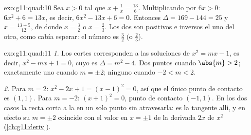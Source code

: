 \begin{solution}{exo:g11:quad:10}
Sea $x > 0$ tal que $x + \frac1x = \frac{13}{6}$. Multiplicando por
$6x > 0$: $6x^2 + 6 = 13x$, es decir, $6x^2 - 13x + 6 = 0$. Entonces
$\Delta = 169 - 144 = 25$ y $x = \frac{13 \pm 5}{12}$, de donde
$x = \frac32$ o $x = \frac23$. Los dos son positivos e inversos el uno del
otro, como cabía esperar: el número es $\frac32$ (o $\frac23$).
\end{solution}

\begin{solution}{exo:g11:quad:11}
\emph{1.} Los cortes corresponden a las soluciones de $x^2 = mx - 1$, es
decir, $x^2 - mx + 1 = 0$, cuyo  es $\Delta = m^2 - 4$. Dos
puntos cuando $\abs{m} > 2$; exactamente uno cuando $m = \pm 2$; ninguno
cuando $-2 < m < 2$.

\emph{2.} Para $m = 2$: $x^2 - 2x + 1 = (x-1)^2 = 0$, así que el único
punto de contacto es $(1, 1)$. Para $m = -2$: $(x+1)^2 = 0$, punto de
contacto $(-1, 1)$. En los dos casos la recta corta a la  en un
solo punto sin atravesarla: es la tangente allí, y en efecto su 
$m = \pm 2$ coincide con el valor en $x = \pm 1$ de la derivada $2x$ de
$x^2$ (\cref{ch:g11:deriv}).
\end{solution}

